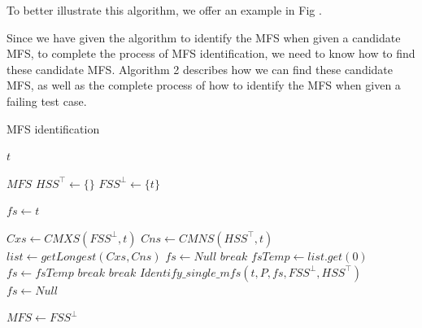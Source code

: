 \documentclass{sig-alternate-05-2015}
\begin{document}
{{To better illustrate this algorithm, we offer an example in Fig .



Since we have given the algorithm to identify the MFS when given a candidate MFS, to complete the process of MFS identification, we need to know how to find these candidate MFS. Algorithm 2 describes how we can find these candidate MFS, as well as the complete process of how to identify the MFS when given a failing test case.



\begin{algorithm}\label{al:identify}
  \caption{MFS identification}
  \begin{algorithmic}[1]
     \Require  $t$ 


     \Ensure  $MFS$ 
    \State $HSS^{\top} \leftarrow \{\}$
    \State $FSS^{\bot} \leftarrow \{ t \} $


    \State $fs \leftarrow t $

        \State $Cxs \leftarrow CMXS(FSS^{\bot}, t) $
        \State $Cns \leftarrow CMNS(HSS^{\top}, t) $
                \State $list \leftarrow getLongest(Cxs, Cns) $
                    \State $fs \leftarrow Null$
                    \State $break$
                \EndIf
                \State $fsTemp \leftarrow list.get(0)$
                    \State $fs \leftarrow fsTemp$
                    \State $break$
                \EndIf
            \EndWhile
        \EndIf
            \State $break$
        \Else
        \State $Identify\_single\_mfs(t, P, fs, FSS^{\bot}, HSS^{\top})$
        \State $fs \leftarrow Null$
        \EndIf

    \EndWhile
     \State $MFS \leftarrow  FSS^{\bot}$
  \end{algorithmic}
\end{algorithm}

}}
\end{document}
